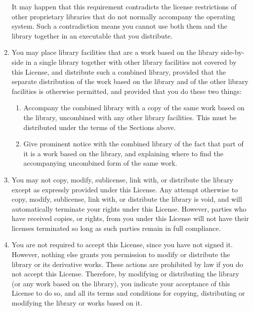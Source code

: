 \documentclass[11pt, letterpaper]{book}
\begin{document}
\begin{enumerate}
It may happen that this requirement contradicts the license restrictions
of other proprietary libraries that do not normally accompany the
operating system. Such a contradiction means you cannot use both them and
the library together in an executable that you distribute.

\item

You may place library facilities that are a work based on the library
side-by-side in a single library together with other library facilities
not covered by this License, and distribute such a combined library,
provided that the separate distribution of the work based on the library
and of the other library facilities is otherwise permitted, and provided
that you do these two things:

\begin{enumerate}

   \item

     Accompany the combined library with a copy of the same work based on
     the library, uncombined with any other library facilities. This must
     be distributed under the terms of the Sections above.

   \item

     Give prominent notice with the combined library of the fact that part
     of it is a work based on the library, and explaining where to find
     the accompanying uncombined form of the same work.
\end{enumerate}

\item

  You may not copy, modify, sublicense, link with, or distribute the
  library except as expressly provided under this License. Any attempt
  otherwise to copy, modify, sublicense, link with, or distribute the
  library is void, and will automatically terminate your rights under this
  License. However, parties who have received copies, or rights, from you
  under this License will not have their licenses terminated so long as
  such parties remain in full compliance.

\item  

  You are not required to accept this License, since you have not signed
  it. However, nothing else grants you permission to modify or distribute
  the library or its derivative works. These actions are prohibited by
  law if you do not accept this License. Therefore, by modifying or
  distributing the library (or any work based on the library), you
  indicate your acceptance of this License to do so, and all its terms and
  conditions for copying, distributing or modifying the library or works
  based on it.


\end{enumerate}
\end{document}
